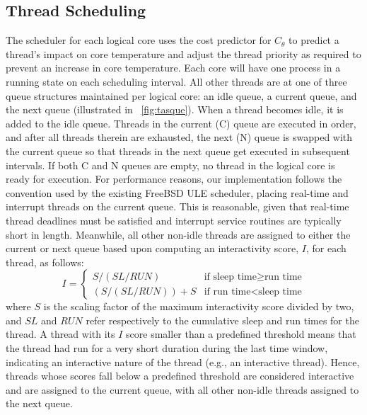 \documentclass[times, 10pt,twocolumn]{IEEEtran}
\begin{document}
\subsection{Thread Scheduling}
\label{sec:selection} 
The scheduler for each logical core uses the cost predictor for $C_{\theta}$ to predict a
thread's impact on core temperature and adjust the thread priority as
required to prevent an increase in core temperature. Each core will have
one process in a running state on each scheduling interval. All other
threads are at one of three queue structures maintained
per logical core: an idle queue, a current queue, and the next queue
(illustrated in \figurename~\ref{fig:tasque}).  When a thread becomes
idle, it is added to the idle queue.
Threads in the current (C) queue are executed in order,
and after all threads therein are exhausted,
the next (N) queue is swapped with the current queue
so that threads in the next queue get executed in subsequent intervals. 
If both C and N queues are empty, no thread in the logical core
is ready for execution.
For performance reasons, our implementation follows the convention used by
the existing FreeBSD ULE scheduler, placing real-time and interrupt
threads on the current queue.  This is reasonable, given that real-time
thread deadlines must be satisfied and interrupt service routines are
typically short in length.  Meanwhile, all other non-idle threads are
assigned to either the current or next queue based upon computing an
interactivity score, $I$, for each thread, as follows:
\begin{equation}
\label{eq:interactsleeprun} 
I =   
\begin{cases}
  S / (SL/RUN) & \text{if sleep time} \geq \text{run time}\\
  (S/ (SL / RUN))+S & \text{if run time} < \text{sleep time}
\end{cases}
\end{equation}
where $S$ is the scaling factor of the
maximum interactivity score divided by two, and $SL$ and $RUN$ refer
respectively to the cumulative sleep and run times for the thread.
A thread with its $I$ score smaller than a predefined threshold means that
the thread had run for a very short duration during the last time window,
indicating an interactive nature of the thread (e.g., an interactive thread).   
Hence, threads whose scores fall below a predefined threshold are considered
interactive and are assigned to the current queue, with all other non-idle
threads assigned to the next queue.
\end{document}
